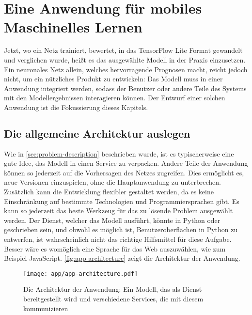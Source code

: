 \chapter{Eine Anwendung für mobiles Maschinelles Lernen}
\label{chap:application}
Jetzt, wo ein Netz trainiert, bewertet,
in das TensorFlow Lite Format gewandelt und verglichen wurde,
heißt es das ausgewählte Modell in der Praxis einzusetzen.
Ein neuronales Netz allein, welches hervorragende Prognosen
macht, reicht jedoch nicht, um ein nützliches Produkt zu entwickeln:
Das Modell muss in einer Anwendung integriert werden, sodass
der Benutzer oder andere Teile des Systems
mit den Modellergebnissen interagieren können.
Der Entwurf einer solchen Anwendung ist die
Fokussierung dieses Kapitels.

\section{Die allgemeine Architektur auslegen}
Wie in \autoref{sec:problem-description} beschrieben wurde, ist es
typischerweise eine gute Idee, das Modell in einen Service zu verpacken.
Andere Teile der Anwendung können so jederzeit auf die Vorhersagen
des Netzes zugreifen. Dies ermöglicht es, neue Versionen
einzuspielen, ohne die Hauptanwendung zu unterbrechen.
Zusätzlich kann die Entwicklung flexibler gestaltet werden,
da es keine Einschränkung auf bestimmte Technologien
und Programmiersprachen gibt. Es kann so jederzeit das
beste Werkzeug für das zu lösende Problem ausgewählt werden.
Der Dienst, welcher das Modell ausführt, könnte in Python oder \cpp{}
geschrieben sein, und obwohl es möglich ist, Benutzeroberflächen 
in Python zu entwerfen, ist \cpp{} wahrscheinlich nicht das
richtige Hilfsmittel für diese Aufgabe.
Besser wäre es womöglich eine Sprache für das Web auszuwählen, 
wie zum Beispiel JavaScript.
\autoref{fig:app-architecture} zeigt die Architektur der Anwendung.
\begin{figure}[h!]
  \centering
  \texttt{[image: app/app-architecture.pdf]}
  \caption{Die Architektur der Anwendung: Ein Modell, das als Dienst
  bereitgestellt wird und verschiedene Services, die mit diesem kommunizieren}
  \label{fig:app-architecture}
\end{figure}

